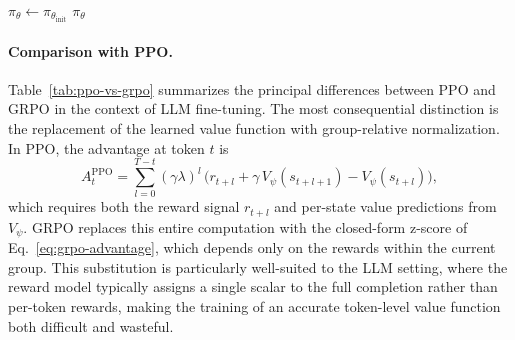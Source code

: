 \begin{algorithm}[t]
\DontPrintSemicolon
\SetAlgoLined
{}
\BlankLine
$\pi_\theta \leftarrow \pi_{\theta_{\text{init}}}$ \;
\Return $\pi_\theta$ \;
\caption{Group Relative Policy Optimization (GRPO)}
\label{alg:grpo}
\end{algorithm}

\paragraph{Comparison with PPO.}
Table~\ref{tab:ppo-vs-grpo} summarizes the principal differences between PPO
and GRPO in the context of LLM fine-tuning.  The most consequential
distinction is the replacement of the learned value function with
group-relative normalization.  In PPO, the advantage at token $t$ is
\begin{equation}
\label{eq:ppo-gae}
A_t^{\text{PPO}} = \sum_{l=0}^{T-t}(\gamma\lambda)^l\,
  \bigl(r_{t+l} + \gamma\, V_\psi(s_{t+l+1}) - V_\psi(s_{t+l})\bigr),
\end{equation}
which requires both the reward signal $r_{t+l}$ and per-state value
predictions from $V_\psi$.  GRPO replaces this entire computation with the
closed-form z-score of Eq.~\eqref{eq:grpo-advantage}, which depends only on
the rewards within the current group.  This substitution is particularly
well-suited to the LLM setting, where the reward model typically assigns a
single scalar to the full completion rather than per-token rewards, making
the training of an accurate token-level value function both difficult and
wasteful.

